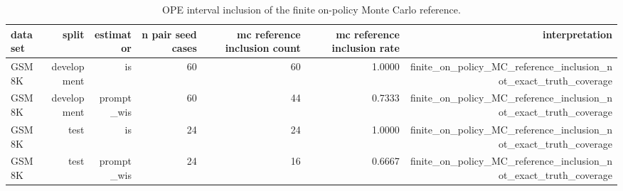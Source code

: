\begin{table}[t]
\centering
\small
\caption{OPE interval inclusion of the finite on-policy Monte Carlo reference.}
\label{tab:mc\_reference\_inclusion}
\begin{tabular}{lrrrrrr}
\toprule
dataset & split & estimator & n pair seed cases & mc reference inclusion count & mc reference inclusion rate & interpretation \\
\midrule
GSM8K & development & is & 60 & 60 & 1.0000 & finite\_on\_policy\_MC\_reference\_inclusion\_not\_exact\_truth\_coverage \\
GSM8K & development & prompt\_wis & 60 & 44 & 0.7333 & finite\_on\_policy\_MC\_reference\_inclusion\_not\_exact\_truth\_coverage \\
GSM8K & test & is & 24 & 24 & 1.0000 & finite\_on\_policy\_MC\_reference\_inclusion\_not\_exact\_truth\_coverage \\
GSM8K & test & prompt\_wis & 24 & 16 & 0.6667 & finite\_on\_policy\_MC\_reference\_inclusion\_not\_exact\_truth\_coverage \\
\bottomrule
\end{tabular}
\end{table}
